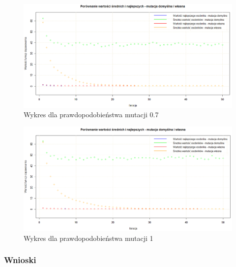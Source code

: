\begin{figure}[H]
	\centering
	\hspace*{-0.8in}
	\includegraphics[scale = 0.5]{img/zad1/mut_0_7}
	\caption{Wykres dla prawdopodobieństwa mutacji 0.7}  
	\label{rys:mut_0.7} 
\end{figure}

\begin{figure}[H]
	\centering
	\hspace*{-0.8in}
	\includegraphics[scale = 0.5]{img/zad1/mut_1}
	\caption{Wykres dla prawdopodobieństwa mutacji 1}  
	\label{rys:mut_1} 
\end{figure}



\subsubsection{Wnioski}

